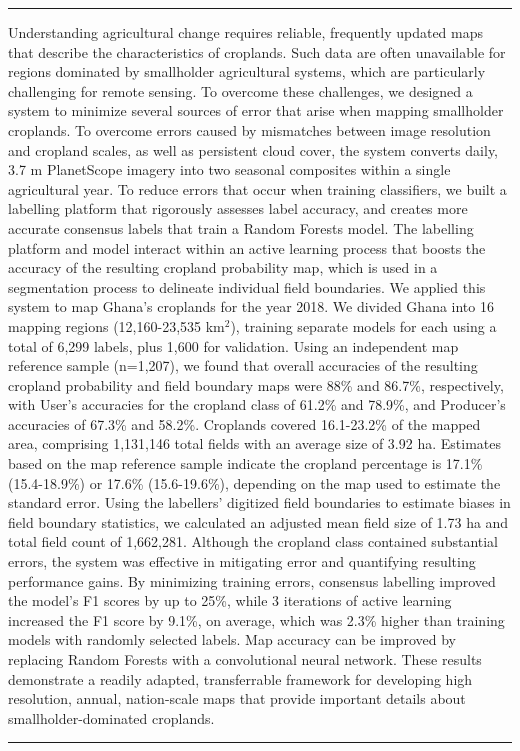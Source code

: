 \documentclass[11pt,a4paper]{article}
\renewenvironment{abstract}{
  \hfill\begin{minipage}{1\textwidth}
  \rule{\textwidth}{1pt}\vspace{5pt}
  \normalsize
  \begin{justify}
  \bfseries\abstractname\vspace{5pt}
  \end{justify}}
  {\par\noindent\rule{\textwidth}{1pt}\end{minipage}
}
\begin{document}
\begin{singlespace}
\begin{abstract}
Understanding agricultural change requires reliable, frequently updated
maps that describe the characteristics of croplands. Such data are often
unavailable for regions dominated by smallholder agricultural systems,
which are particularly challenging for remote sensing. To overcome these
challenges, we designed a system to minimize several sources of error
that arise when mapping smallholder croplands. To overcome errors caused
by mismatches between image resolution and cropland scales, as well as
persistent cloud cover, the system converts daily, 3.7 m PlanetScope
imagery into two seasonal composites within a single agricultural year.
To reduce errors that occur when training classifiers, we built a
labelling platform that rigorously assesses label accuracy, and creates
more accurate consensus labels that train a Random Forests model. The
labelling platform and model interact within an active learning process
that boosts the accuracy of the resulting cropland probability map,
which is used in a segmentation process to delineate individual field
boundaries. We applied this system to map Ghana's croplands for the year
2018. We divided Ghana into 16 mapping regions (12,160-23,535 km\(^2\)),
training separate models for each using a total of 6,299 labels, plus
1,600 for validation. Using an independent map reference sample
(n=1,207), we found that overall accuracies of the resulting cropland
probability and field boundary maps were 88\% and 86.7\%, respectively,
with User's accuracies for the cropland class of 61.2\% and 78.9\%, and
Producer's accuracies of 67.3\% and 58.2\%. Croplands covered
16.1-23.2\% of the mapped area, comprising 1,131,146 total fields with
an average size of 3.92 ha. Estimates based on the map reference sample
indicate the cropland percentage is 17.1\% (15.4-18.9\%) or 17.6\%
(15.6-19.6\%), depending on the map used to estimate the standard error.
Using the labellers' digitized field boundaries to estimate biases in
field boundary statistics, we calculated an adjusted mean field size of
1.73 ha and total field count of 1,662,281. Although the cropland class
contained substantial errors, the system was effective in mitigating
error and quantifying resulting performance gains. By minimizing
training errors, consensus labelling improved the model's F1 scores by
up to 25\%, while 3 iterations of active learning increased the F1 score
by 9.1\%, on average, which was 2.3\% higher than training models with
randomly selected labels. Map accuracy can be improved by replacing
Random Forests with a convolutional neural network. These results
demonstrate a readily adapted, transferrable framework for developing
high resolution, annual, nation-scale maps that provide important
details about smallholder-dominated croplands.
\end{abstract}
\end{singlespace}
\end{document}
